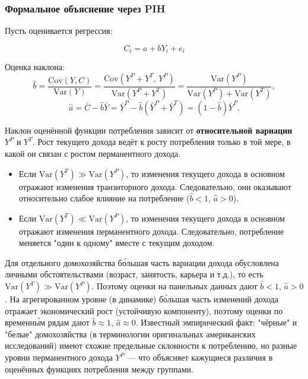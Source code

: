 \documentclass[10pt,a4paper]{article}
\begin{document}
\subsubsection{Формальное объяснение через PIH}

Пусть оценивается регрессия:
\begin{formulabox}
\begin{equation}
C_i = a + bY_i + e_i \tag{7.$*$}
\end{equation}
\end{formulabox}

Оценка наклона:
$$\hat b = \frac{\mathrm{Cov}(Y,C)}{\mathrm{Var}(Y)} = \frac{\mathrm{Cov}(Y^{P}+Y^{T},\,Y^{P})}{\mathrm{Var}(Y^{P}+Y^{T})} = \frac{\mathrm{Var}(Y^{P})}{\mathrm{Var}(Y^{P})+\mathrm{Var}(Y^{T})},$$
$$\hat a = \bar C - \hat b\bar Y = \bar Y^{P} - \hat b(\bar Y^{P}+\bar Y^{T}) = (1-\hat b)\bar Y^{P}.$$

Наклон оценённой функции потребления зависит от \textbf{относительной вариации} $Y^{P}$ и $Y^{T}$. Рост текущего дохода ведёт к росту потребления только в той мере, в какой он связан с ростом перманентного дохода.

\begin{intuition}
\begin{itemize}[leftmargin=1.3em]
\item Если $\mathrm{Var}(Y^{T}) \gg \mathrm{Var}(Y^{P})$, то изменения текущего дохода в основном отражают изменения транзиторного дохода. Следовательно, они оказывают относительно слабое влияние на потребление ($\hat b<1$, $\hat a>0$).
\item Если $\mathrm{Var}(Y^{T}) \ll \mathrm{Var}(Y^{P})$, то изменения текущего дохода в основном отражают изменения перманентного дохода. Следовательно, потребление меняется "один к одному" вместе с текущим доходом.
\end{itemize}
Для отдельного домохозяйства бо́льшая часть вариации дохода обусловлена личными обстоятельствами (возраст, занятость, карьера и т.д.), то есть $\mathrm{Var}(Y^{T})\gg\mathrm{Var}(Y^{P})$. Поэтому оценки на панельных данных дают $\hat b<1$, $\hat a>0$. На агрегированном уровне (в динамике) бо́льшая часть изменений дохода отражает экономический рост (устойчивую компоненту), поэтому оценки по временны́м рядам дают $\hat b\approx 1$, $\hat a\approx 0$. Известный эмпирический факт: "чёрные" и "белые" домохозяйства (в терминологии оригинальных американских исследований) имеют схожие предельные склонности к потреблению, но разные уровни перманентного дохода $Y^{P}$ — что объясняет кажущиеся различия в оценённых функциях потребления между группами.
\end{intuition}
\end{document}
